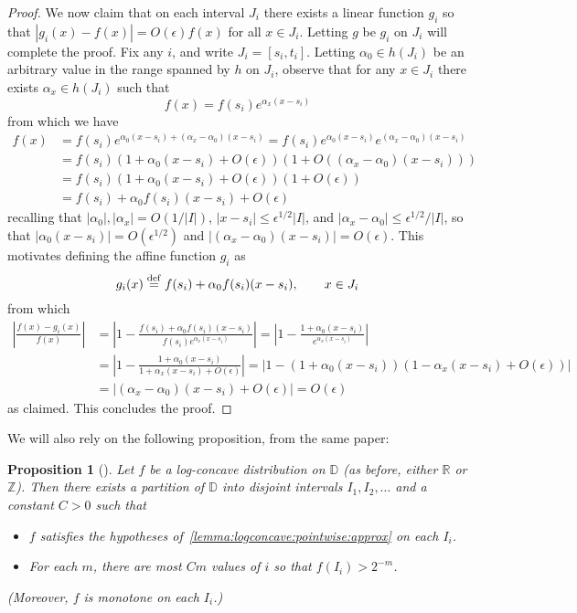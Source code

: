 \documentclass[11pt]{article}
\newtheorem{proposition}[theorem]{Proposition}
\theoremstyle{definition}
\newcommand{\R}{\mathbb{R}}
\newcommand{\Z}{\mathbb{Z}}
\newcommand{\eps}{\epsilon}
\newcommand{\abs}[1]{\lvert#1\rvert}
\newcommand{\eqdef}{\stackrel{{\mathrm {\footnotesize def}}}{=}}
\renewcommand{\abs}[1]{\left\lvert #1 \right\rvert}
\begin{document}
\begin{proof}
We now claim that on each interval $J_i$ there exists a linear function $g_i$ so that $\abs{g_i(x)-f(x)} = O(\eps)f(x)$ for all $x\in J_i$. Letting $g$ be $g_i$ on $J_i$ will complete the proof. Fix any $i$, and write $J_i=[s_i,t_i]$. Letting $\alpha_0\in h(J_i)$ be an arbitrary value in the range spanned by $h$ on $J_i$, observe that for any $x\in J_i$ there exists $\alpha_x\in h(J_i)$ such that 
\[
  f(x) = f(s_i) e^{\alpha_x(x-s_i)}
\]
from which we have
\begin{align*}
  f(x) &= f(s_i) e^{\alpha_0(x-s_i)+(\alpha_x-\alpha_0)(x-s_i)}
  = f(s_i) e^{\alpha_0(x-s_i)}e^{(\alpha_x-\alpha_0)(x-s_i)}\\
  &= f(s_i) \left(1+\alpha_0(x-s_i)+O(\eps)\right)(1+O((\alpha_x-\alpha_0)(x-s_i)))\\
  &= f(s_i) \left(1+\alpha_0(x-s_i)+O(\eps)\right)(1+O(\eps))\\
  &= f(s_i)+\alpha_0f(s_i)(x-s_i)+O(\eps)
\end{align*}
recalling that $\abs{\alpha_0},\abs{\alpha_x}=O(1/\abs{I})$, $\abs{x-s_i}\leq \eps^{1/2}\abs{I}$, and $\abs{\alpha_x-\alpha_0}\leq \eps^{1/2}/\abs{I}$, so that $\abs{\alpha_0(x-s_i)} = O(\eps^{1/2})$ and $\abs{(\alpha_x-\alpha_0)(x-s_i)} = O(\eps)$. This motivates defining the affine function $g_i$ as
\[
    g_i(x) \eqdef f(s_i)+\alpha_0f(s_i)(x-s_i), \qquad x\in J_i
\]
from which
\begin{align*}
    \abs{\frac{f(x)-g_i(x)}{f(x)}} 
    &= \abs{1-\frac{f(s_i)+\alpha_0f(s_i)(x-s_i)}{f(s_i) e^{\alpha_x(x-s_i)}}}
    = \abs{1-\frac{1+\alpha_0(x-s_i)}{e^{\alpha_x(x-s_i)}}} \\
    &= \abs{1-\frac{1+\alpha_0(x-s_i)}{1+\alpha_x(x-s_i)+O(\eps)}} 
    = \abs{1-\left( 1+\alpha_0(x-s_i)\right)\left( 1-\alpha_x(x-s_i)+O(\eps)\right)} \\
    &= \abs{(\alpha_x-\alpha_0)(x-s_i)+O(\eps)} = O(\eps)
\end{align*}
as claimed. This concludes the proof.
\end{proof}

\noindent We will also rely on the following proposition, from the same paper:
\begin{proposition}[{\cite[Proposition 15]{DKS:16:LLCV}}]\label{proposition:logconcave:interval:partition}
Let $f$ be a log-concave distribution on $\mathbb{D}$ (as before, either $\R$ or $\Z$). Then there exists a partition of $\mathbb{D}$ into disjoint intervals $I_1, I_2,\ldots$ and a constant $C>0$ such that
\begin{itemize}
\item $f$ satisfies the hypotheses of~\cref{lemma:logconcave:pointwise:approx} on each $I_i$.
\item For each $m$, there are most $Cm$ values of $i$ so that $f(I_i) > 2^{-m}$.
\end{itemize}
(Moreover, $f$ is monotone on each $I_i$.)
\end{proposition}
\end{document}
